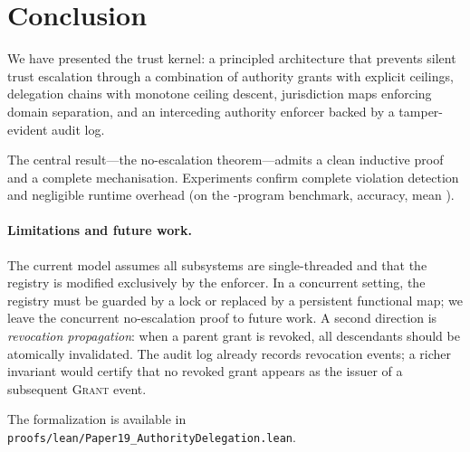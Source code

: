 \documentclass[11pt]{article}
\begin{document}
\section{Conclusion}\label{sec:conclusion}

We have presented the \JuGeo{} trust kernel: a principled
architecture that prevents silent trust escalation through a
combination of authority grants with explicit ceilings, delegation
chains with monotone ceiling descent, jurisdiction maps enforcing
domain separation, and an interceding authority enforcer backed by
a tamper-evident audit log.

The central result—the no-escalation theorem—admits a clean
inductive proof and a complete \LEAN{} mechanisation.  Experiments
confirm complete violation detection and negligible runtime overhead
(on the \expTotalPrograms-program benchmark, \expAccuracy{} accuracy, mean \expTimeMean).

\paragraph{Limitations and future work.}
The current model assumes all subsystems are single-threaded and
that the registry is modified exclusively by the enforcer.
In a concurrent setting, the registry must be guarded by a lock
or replaced by a persistent functional map; we leave the concurrent
no-escalation proof to future work.
A second direction is \emph{revocation propagation}: when a parent
grant is revoked, all descendants should be atomically invalidated.
The audit log already records revocation events; a richer invariant
would certify that no revoked grant appears as the issuer of a
subsequent \textsc{Grant} event.

\bigskip\noindent
The \LEAN{} formalization is available in
\texttt{proofs/lean/Paper19\_AuthorityDelegation.lean}.
\end{document}
